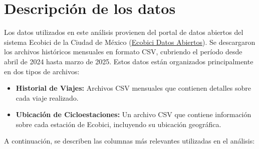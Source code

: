 \documentclass[12pt]{article}
\begin{document}
\section{Descripción de los datos}
    Los datos utilizados en este análisis provienen del portal de datos abiertos del sistema Ecobici de la Ciudad de México (\href{https://ecobici.cdmx.gob.mx/datos-abiertos/}{Ecobici Datos Abiertos}). Se descargaron los archivos históricos mensuales en formato CSV, cubriendo el período desde abril de 2024 hasta marzo de 2025.
    Estos datos están organizados principalmente en dos tipos de archivos:
    \begin{itemize}
        \item \textbf{Historial de Viajes:} Archivos CSV mensuales que contienen detalles sobre cada viaje realizado.
        \item \textbf{Ubicación de Cicloestaciones:} Un archivo CSV que contiene información sobre cada estación de Ecobici, incluyendo su ubicación geográfica.
    \end{itemize}

    A continuación, se describen las columnas más relevantes utilizadas en el análisis:
\end{document}
